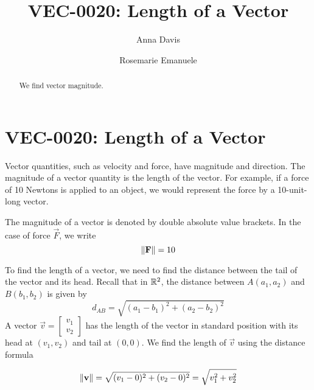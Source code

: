 \documentclass{ximera}
\author{Anna Davis \and Rosemarie Emanuele} \title{VEC-0020:  Length of a Vector} \license{CC-BY 4.0}
\begin{document}
\begin{abstract}
 We find vector magnitude.
\end{abstract}
\maketitle

\section*{VEC-0020:  Length of a Vector}

Vector quantities, such as velocity and force, have magnitude and direction.  The magnitude of a vector quantity is the length of the vector.  For example, if a force of 10 Newtons is applied to an object, we would represent the force by a 10-unit-long vector.


The magnitude of a vector is denoted by double absolute value brackets.  In the case of force $\vec{F}$, we write $$\left\lVert\mathbf{F}\right\rVert=10$$

To find the length of a vector, we need to find the distance between the tail of the vector and its head.  Recall that in $\mathbb{R}^2$, the distance between $A(a_1, a_2)$ and $B(b_1, b_2)$ is given by 
\begin{equation*}
d_{AB}=\sqrt{(a_1-b_1)^2+(a_2-b_2)^2}
\end{equation*}
A vector $\vec{v}=\begin{bmatrix}v_1\\ v_2\end{bmatrix}$ has the length of  the vector in standard position with its head at $(v_1, v_2)$ and tail at $(0, 0)$. We find the length of $\vec{v}$ using the distance formula

\begin{equation}\label{eq:normr2}
\left\lVert\mathbf{v}\right\rVert=\sqrt{(v_1-0)^2+(v_2-0)^2}=\sqrt{v_1^2+v_2^2}
\end{equation}
\end{document}
